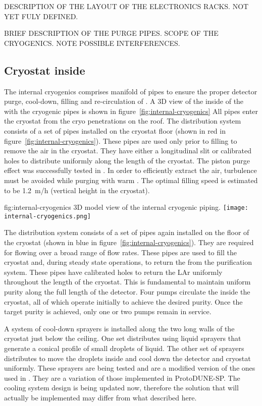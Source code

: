 DESCRIPTION OF THE LAYOUT OF THE ELECTRONICS RACKS. NOT YET FULY DEFINED.

BRIEF DESCRIPTION OF THE PURGE PIPES. SCOPE OF THE CRYOGENICS. NOTE POSSIBLE INTERFERENCES.

\subsection{Cryostat inside}
The internal cryogenics comprises manifold of pipes to ensure the proper detector purge, cool-down, filling and re-circulation of .
A 3D view of the inside of the  with the cryogenic pipes is shown in figure~\ref{fig:internal-cryogenics}
All pipes enter the cryostat from the cryo penetrations on the roof.
The  distribution system consists of a set of pipes installed on the cryostat floor (shown in red in figure~\ref{fig:internal-cryogenics}).
These pipes are used only prior to filling to remove the air in the cryostat.
They have either a longitudinal slit or calibrated holes to distribute  uniformly along the length of the cryostat.
The piston purge effect was successfully tested in .
In order to efficiently extract the air, turbulence must be avoided while purging with warm .
The optimal filling speed is estimated to be 1.2~m/h (vertical height in the cryostat).
\begin{dunefigure}{fig:internal-cryogenics}
{3D model view of the internal cryogenic piping.}
\texttt{[image: internal-cryogenics.png]}
\end{dunefigure}

The  distribution system consists of a set of pipes again installed on the floor of the cryostat (shown in blue in figure~\ref{fig:internal-cryogenics}).
They are required for flowing  over a broad range of flow rates.
These pipes are used to fill the cryostat and, during steady state operations, to return the  from the purification system.
These pipes have calibrated holes to return the LAr uniformly throughout the length of the cryostat.
This is fundamental to maintain uniform purity along the full length of the detector.
Four pumps circulate the  inside the cryostat, all of which operate initially to achieve the desired purity.
Once the target purity is achieved, only one or two pumps remain in service.

A system of cool-down sprayers is installed along the two long walls of the cryostat just below the ceiling.
One set distributes  using liquid sprayers that generate a conical profile of small droplets of liquid.
The other set of sprayers distributes  to move the  droplets inside and cool down the detector and cryostat uniformly.
These sprayers are being tested  and are a modified version of the ones used in .
They are a variation of those implemented in ProtoDUNE-SP.
The cooling system design is being updated now, therefore the solution that will actually be implemented may differ from what described here.

